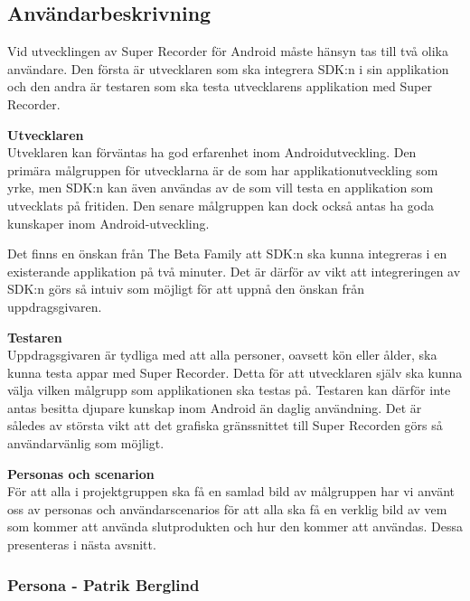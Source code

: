 \subsection{Användarbeskrivning}
\label{subsec:userdesc}

Vid utvecklingen av Super Recorder för Android måste hänsyn tas till två olika användare. Den första är utvecklaren som ska integrera SDK:n i sin applikation och den andra är testaren som ska testa utvecklarens applikation med Super Recorder.

\textbf{Utvecklaren} \\
Utveklaren kan förväntas ha god erfarenhet inom Androidutveckling. Den primära målgruppen för utvecklarna är de som har applikationutveckling som yrke, men SDK:n kan även användas av de som vill testa en applikation som utvecklats på fritiden. Den senare målgruppen kan dock också antas ha goda kunskaper inom Android-utveckling. 

Det finns en önskan från The Beta Family att SDK:n ska kunna integreras i en existerande applikation på två minuter. Det är därför av vikt att integreringen av SDK:n görs så intuiv som möjligt för att uppnå den önskan från uppdragsgivaren.

\textbf{Testaren} \\
Uppdragsgivaren är tydliga med att alla personer, oavsett kön eller ålder, ska kunna testa appar med Super Recorder. Detta för att utvecklaren själv ska kunna välja vilken målgrupp som applikationen ska testas på. Testaren kan därför inte antas besitta djupare kunskap inom Android än daglig användning. Det är således av största vikt att det grafiska gränssnittet till Super Recorden görs så användarvänlig som möjligt.

\textbf{Personas och scenarion} \\
För att alla i projektgruppen ska få en samlad bild av målgruppen har vi använt oss av personas och användarscenarios för att alla ska få en verklig bild av vem som kommer att använda slutprodukten och hur den kommer att användas. Dessa presenteras i nästa avsnitt.
\newpage	
\subsubsection{Persona - Patrik Berglind}

\vspace{40px}

